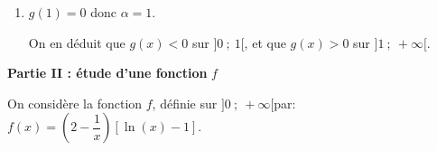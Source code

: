 \begin{enumerate}
D'après ce tableau de variations, on peut dire que l'équation $g(x) = 0$ admet une unique solution $\alpha$ sur $]0~;~ +\infty[$. 

\item $g(1)=0$ donc $\alpha=1$.%

On en déduit que $g(x)<0$ sur $]0~;~1[$, et que $g(x) >0$ sur $]1~;~+\infty[$.

\end{enumerate}

\bigskip

\textbf{Partie II : étude d'une fonction } \boldmath $f$\unboldmath

\medskip

On considère la fonction $f$, définie sur $]0~;~ +\infty[$par: $f(x) = \left(2 - \dfrac{1}{x}\right)[\ln (x) - 1]$.

